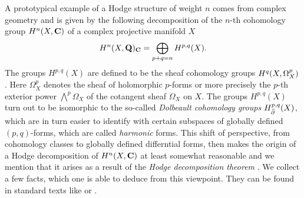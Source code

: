 A prototypical example of a Hodge structure of weight $n$ comes from complex geometry and is given by the following decomposition of the $n$-th cohomology group $H^{n}(X, \mathbf C)$ of a complex projective manifold $X$
\begin{equation}
    \label{eq: Hodge decompositon on complex manifold}
    H^n(X, \mathbf Q)_\mathbf C = \bigoplus_{p+q = n} H^{p,q}(X).
\end{equation}
The groups $H^{p,q}(X)$ are defined to be the sheaf cohomology groups $H^{q}(X, \Omega_X^p)$. 
Here $\Omega_X^p$ denotes the sheaf of holomorphic $p$-forms or more precisely the $p$-th exterior power $\bigwedge^p \Omega_X$ of the cotangent sheaf $\Omega_X$ on $X$. 
The groups $H^{p,q}(X)$ turn out to be isomorphic to the so-called \emph{Dolbeault cohomology groups} $H^{p,q}_{\,\overline{\!{\partial}}}(X)$, which are in turn easier to identify with certain subspaces of globally defined $(p,q)$-forms, which are called \emph{harmonic} forms. This shift of perspective, from cohomology classes to globally defined differntial forms, then makes the origin of a Hodge decomposition of $H^{n}(X, \mathbf C)$ at least somewhat reasonable and we mention that it arises as a result of the \emph{Hodge decomposition theorem} \cite[\S 0.6]{GriffithsHarris1994}.
We collect a few facts, which one is able to deduce from this viewpoint. They can be found in standard texts like \cite{GriffithsHarris1994} or \cite{Voisin2002}.
